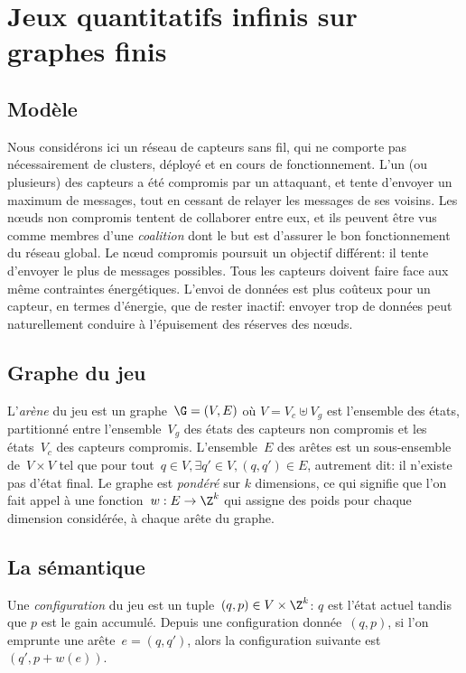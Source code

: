\section{Jeux quantitatifs infinis sur graphes finis}
\label{tj:sec:model}

\subsection{Modèle}
Nous considérons ici un réseau de capteurs sans fil, qui ne comporte pas nécessairement de clusters, déployé et en cours de fonctionnement.
L'un (ou plusieurs) des capteurs a été compromis par un attaquant, et tente d'envoyer un maximum de messages, tout en cessant de relayer les messages de ses voisins.
Les nœuds non compromis tentent de collaborer entre eux, et ils peuvent être vus comme membres d'une \emph{coalition} dont le but est d'assurer le bon fonctionnement du réseau global.
Le nœud compromis poursuit un objectif différent: il tente d'envoyer le plus de messages possibles.
Tous les capteurs doivent faire face aux même contraintes énergétiques.
L'envoi de données est plus coûteux pour un capteur, en termes d'énergie, que de rester inactif: envoyer trop de données peut naturellement conduire à l'épuisement des réserves des nœuds.

\subsection{Graphe du jeu}
L'\emph{arène} du jeu est un graphe~$\G = (V,E)$ où $V = V_c \uplus V_g$ est l'ensemble des états, partitionné entre l'ensemble~$V_g$ des états des capteurs non compromis et les états~$V_c$ des capteurs compromis.
L'ensemble~$E$ des arêtes est un sous-ensemble de~$V \times V$ tel que pour tout~$q \in V, \exists q' \in V, (q,q')\in E$, autrement dit: il n'existe pas d'état final.
Le graphe est \emph{pondéré} sur $k$ dimensions, ce qui signifie que l'on fait appel à une fonction~$w: E \rightarrow \Z^k$ qui assigne des poids pour chaque dimension considérée, à chaque arête du graphe.

\subsection{La sémantique}
Une \emph{configuration} du jeu est un tuple~$(q,p) \in V \times \Z^k$: $q$ est l'état actuel tandis que $p$ est le gain accumulé.
Depuis une configuration donnée~$(q,p)$, si l'on emprunte une arête~$e=(q,q')$, alors la configuration suivante est $(q',p+w(e))$.

